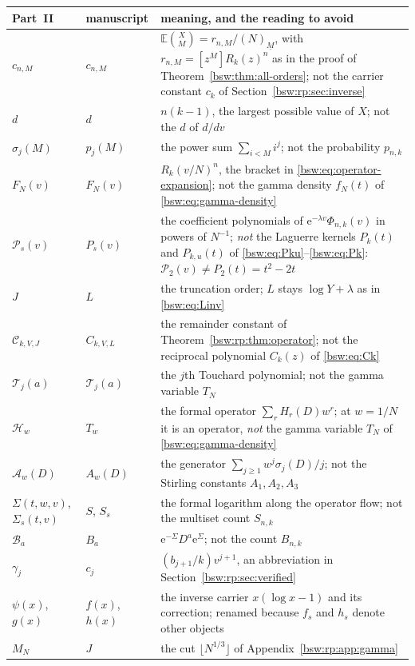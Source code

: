 \documentclass[11pt,letterpaper]{article}
\theoremstyle{definition}
\theoremstyle{remark}
\newcommand{\EE}{\mathbb E}
\newcommand{\ee}{\mathrm e}
\newcommand{\fall}[2]{(#1)_{\underline{#2}}}
\newcommand{\coef}[2]{[#1]#2}
\begin{document}
\begin{center}\small
\begin{tabular}{>{\raggedright\arraybackslash}p{}>{\raggedright\arraybackslash}p{}>{\raggedright\arraybackslash}p{}}
\toprule
Part~II & manuscript & meaning, and the reading to avoid\\
\midrule
$c_{n,M}$ & $c_{n,M}$ & $\EE\binom XM=r_{n,M}/\fall NM$, with
 $r_{n,M}=\coef{z^M}{R_k(z)^n}$ as in the proof of
 Theorem~\ref{bsw:thm:all-orders}; not the carrier constant $c_k$ of
 Section~\ref{bsw:rp:sec:inverse}\\
$d$ & $d$ & $n(k-1)$, the largest possible value of $X$; not the $d$ of
 $d/dv$\\
$\sigma_j(M)$ & $p_j(M)$ & the power sum $\sum_{i<M}i^j$; not the
 probability $p_{n,k}$\\
$F_N(v)$ & $F_N(v)$ & $R_k(v/N)^n$, the bracket in
 \eqref{bsw:eq:operator-expansion}; not the gamma density $f_N(t)$ of
 \eqref{bsw:eq:gamma-density}\\
$\mathcal P_s(v)$ & $P_s(v)$ & the coefficient polynomials of
 $\ee^{-\lambda v}\Phi_{n,k}(v)$ in powers of $N^{-1}$; \emph{not} the
 Laguerre kernels $P_k(t)$ and $P_{k,u}(t)$ of
 \eqref{bsw:eq:Pku}--\eqref{bsw:eq:Pk}: $\mathcal P_2(v)\ne P_2(t)=t^2-2t$\\
$J$ & $L$ & the truncation order; $L$ stays $\log Y+\lambda$ as in
 \eqref{bsw:eq:Linv}\\
$\mathcal C_{k,V,J}$ & $C_{k,V,L}$ & the remainder constant of
 Theorem~\ref{bsw:rp:thm:operator}; not the reciprocal polynomial $C_k(z)$
 of \eqref{bsw:eq:Ck}\\
$\mathcal T_j(a)$ & $\mathcal T_j(a)$ & the $j$th Touchard polynomial; not
 the gamma variable $T_N$\\
$\mathcal H_w$ & $T_w$ & the formal operator $\sum_r H_r(D)w^r$; at
 $w=1/N$ it is an operator, \emph{not} the gamma variable $T_N$ of
 \eqref{bsw:eq:gamma-density}\\
$\mathcal A_w(D)$ & $A_w(D)$ & the generator
 $\sum_{j\ge1}w^j\sigma_j(D)/j$; not the Stirling constants $A_1,A_2,A_3$\\
$\Sigma(t,w,v)$, $\Sigma_s(t,v)$ & $S$, $S_s$ & the formal logarithm along
 the operator flow; not the multiset count $S_{n,k}$\\
$\mathcal B_a$ & $B_a$ & $\ee^{-\Sigma}D^a\ee^{\Sigma}$; not the count
 $B_{n,k}$\\
$\gamma_j$ & $c_j$ & $(b_{j+1}/k)v^{j+1}$, an abbreviation in
 Section~\ref{bsw:rp:sec:verified}\\
$\psi(x)$, $g(x)$ & $f(x)$, $h(x)$ & the inverse carrier $x(\log x-1)$ and
 its correction; renamed because $f_s$ and $h_s$ denote other objects\\
$M_N$ & $J$ & the cut $\lfloor N^{1/3}\rfloor$ of
 Appendix~\ref{bsw:rp:app:gamma}\\
\bottomrule
\end{tabular}
\end{center}
\end{document}
